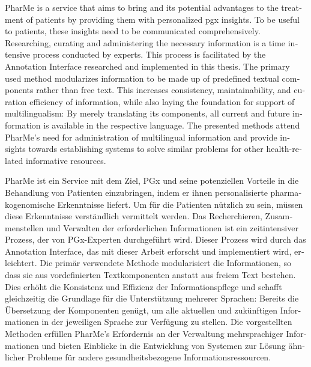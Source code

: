 \null\vfil
\begin{otherlanguage}{english}
\begin{center}\textsf{\textbf{\abstractname}}\end{center}

    \noindent PharMe is a service that aims to bring  and its
    potential advantages to the treatment of patients by providing them with
    personalized \gls{pgx} insights. To be useful to patients, these insights
    need to be communicated comprehensively. Researching, curating and
    administering the necessary information is a time intensive process
    conducted by  experts. This process is facilitated by the
    Annotation Interface researched and implemented in this thesis. The primary
    used method modularizes information to be made up of predefined textual
    components rather than free text. This increases consistency,
    maintainability, and curation efficiency of information, while also laying
    the foundation for support of multilingualism: By merely translating its
    components, all current and future information is available in the
    respective language. The presented methods attend PharMe's need for
    administration of multilingual information and provide insights towards
    establishing systems to solve similar problems for other health-related
    informative resources.

\end{otherlanguage}
\vfil\null

\null\vfil
\begin{otherlanguage}{ngerman}
\begin{center}\textsf{\textbf{\abstractname}}\end{center}

    \noindent PharMe ist ein Service mit dem Ziel, PGx und seine potenziellen
    Vorteile in die Behandlung von Patienten einzubringen, indem er ihnen
    personalisierte pharmakogenomische Erkenntnisse liefert. Um für die
    Patienten nützlich zu sein, müssen diese Erkenntnisse verständlich
    vermittelt werden. Das Recherchieren, Zusammenstellen und Verwalten der
    erforderlichen Informationen ist ein zeitintensiver Prozess, der von
    PGx-Experten durchgeführt wird. Dieser Prozess wird durch das Annotation
    Interface, das mit dieser Arbeit erforscht und implementiert wird,
    erleichtert. Die primär verwendete Methode modularisiert die Informationen,
    so dass sie aus vordefinierten Textkomponenten anstatt aus freiem Text
    bestehen. Dies erhöht die Konsistenz und Effizienz der Informationspflege
    und schafft gleichzeitig die Grundlage für die Unterstützung mehrerer
    Sprachen: Bereits die Übersetzung der Komponenten genügt, um alle aktuellen
    und zukünftigen Informationen in der jeweiligen Sprache zur Verfügung zu
    stellen. Die vorgestellten Methoden erfüllen PharMe's Erfordernis an der
    Verwaltung mehrsprachiger Informationen und bieten Einblicke in die
    Entwicklung von Systemen zur Lösung ähnlicher Probleme für andere
    gesundheitsbezogene Informationsressourcen.

\end{otherlanguage}
\vfil\null
